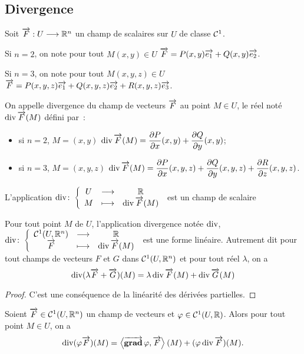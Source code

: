 \subsection{Divergence}

Soit \(\overrightarrow{F} : U \longrightarrow \mathbb{R}^n\) un champ de scalaires sur \(U\) de classe \(\mathcal{C}^{1}\).

Si \(n=2\), on note pour tout \(M(x,y) \in U\) \(\overrightarrow{F}=P(x,y)\overrightarrow{e_1} + Q(x,y)\overrightarrow{e_2}\).

Si \(n=3\), on note pour tout \(M(x,y,z) \in U\) \(\overrightarrow{F}=P(x,y,z)\overrightarrow{e_1} + Q(x,y,z)\overrightarrow{e_2}+R(x,y,z)\overrightarrow{e_3}\).

\begin{defdef}
  On appelle divergence du champ de vecteurs \(\overrightarrow{F}\) au point \(M \in U\), le réel noté \(\operatorname{div} \overrightarrow{F}(M)\) défini par~:
  \begin{itemize}
    \item si \(n=2\), \(M=(x,y)\) \(\operatorname{div} \overrightarrow{F}(M)=\dfrac{\partial{} P}{\partial{} x}(x,y) + \dfrac{\partial{} Q}{\partial{} y}(x,y)\);
    \item si \(n=3\), \(M=(x,y,z)\) \(\operatorname{div} \overrightarrow{F}(M)=\dfrac{\partial{} P}{\partial{} x}(x,y,z) + \dfrac{\partial{} Q}{\partial{} y}(x,y,z) + \dfrac{\partial{} R}{\partial{} z}(x,y,z)\).
  \end{itemize}
  L'application \(\operatorname{div}\colon \left\{\begin{array}{ccc} U & \longrightarrow &\mathbb{R}\\ M & \longmapsto & \operatorname{div} \overrightarrow{F}(M) \end{array} \right.\) est un champ de scalaire
\end{defdef}
%
\begin{prop}
  Pour tout point \(M\) de \(U\), l'application divergence notée \(\operatorname{div}\), \(\operatorname{div}\colon \left\{\begin{array}{ccc} \mathcal{C}^{1}(U, \mathbb{R}^n) & \longrightarrow &\mathbb{R}\\ \overrightarrow{F} & \longmapsto & \operatorname{div}\overrightarrow{F}(M) \end{array} \right.\) est une forme linéaire. Autrement dit pour tout champs de vecteurs \(F\) et \(G\) dans \(\mathcal{C}^{1}(U, \mathbb{R}^n)\) et pour tout réel \(\lambda\), on a
  \begin{equation}
    \operatorname{div}(\lambda \overrightarrow{F} + \overrightarrow{G})(M) = \lambda \operatorname{div} \overrightarrow{F}(M) + \operatorname{div} \overrightarrow{G}(M)
  \end{equation}
\end{prop}
\begin{proof}
  C'est une conséquence de la linéarité des dérivées partielles.
\end{proof}
%
\begin{prop}
  Soient \(\overrightarrow{F} \in \mathcal{C}^{1}(U, \mathbb{R}^n)\) un champ de vecteurs et \(\varphi \in \mathcal{C}^{1}(U, \mathbb{R})\). Alors pour tout point \(M \in U\), on a
  \begin{equation}
    \operatorname{div}(\varphi \overrightarrow{F})(M)=\left\langle{\operatorname{\overrightarrow{\mathbf{grad}}}{\varphi}},{\overrightarrow{F}}\right\rangle(M) + (\varphi \operatorname{div} \overrightarrow{F})(M).
  \end{equation}
\end{prop}
